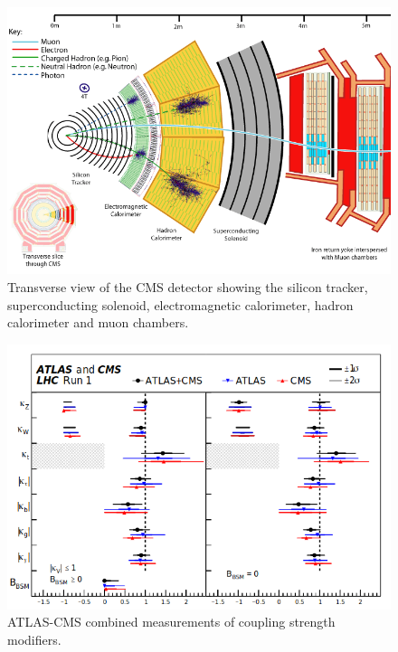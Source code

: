 \documentclass[final,3p]{CSP}
\begin{document}
\begin{figure}[H]
	\centering
	\includegraphics[scale=0.36]{./cms12.png}
	\caption{Transverse view of the CMS detector showing the silicon tracker, superconducting solenoid, electromagnetic calorimeter, hadron calorimeter and muon chambers.}
	\label{figure 6}
\end{figure}

\begin{figure}[H]
	\centering
	\includegraphics[scale=0.4]{./cd7.png}
	\caption{ATLAS-CMS combined measurements of coupling strength modifiers.}
	\label{figure 7}
\end{figure}
\end{document}
